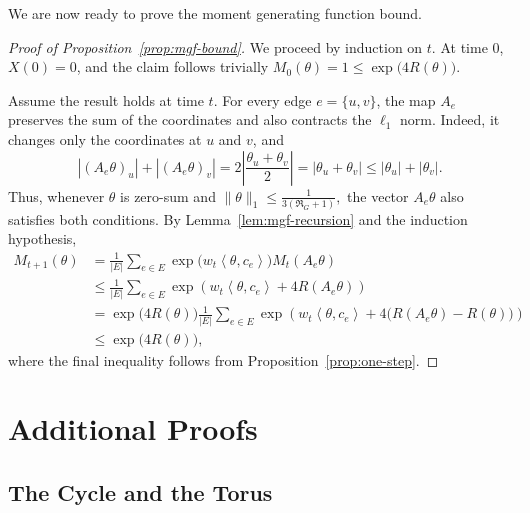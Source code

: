 \documentclass[11pt]{article}
\numberwithin{equation}{section}
\newcommand{\1}{\mathbf{1}}
\newcommand{\ip}[2]{\left\langle #1,#2\right\rangle}
\begin{document}
\medskip

We are now ready to prove the moment generating function bound.

\medskip

\begin{proof}[Proof of Proposition~\ref{prop:mgf-bound}]
We proceed by induction on \(t\). At time \(0\), \(X(0)=0\), and the claim follows trivially
\(
M_0(\theta)=1\le\exp\bigl(4R(\theta)\bigr).
\)

\medskip

Assume the result holds at time \(t\). For every edge \(e=\{u,v\}\), the map \(A_e\) preserves the sum of the coordinates and also contracts the \(\ell_1\) norm. Indeed, it changes only the coordinates at \(u\) and \(v\), and
\[
|(A_e\theta)_u|+|(A_e\theta)_v|
=
2\left|
\frac{\theta_u+\theta_v}{2}
\right|
=
|\theta_u+\theta_v|
\le
|\theta_u|+|\theta_v|.
\]
Thus, whenever \(\theta\) is zero-sum and \( \|\theta\|_1 \le \frac{1}{3(\Re_G+1)}, \) the vector \(A_e\theta\) also satisfies both conditions. By Lemma~\ref{lem:mgf-recursion} and the induction hypothesis,
\[
\begin{aligned}
M_{t+1}(\theta)
&=
\frac1{|E|}
\sum_{e\in E}
\exp\bigl(w_t\ip{\theta}{c_e}\bigr)
M_t(A_e\theta)\\
&\le
\frac1{|E|}
\sum_{e\in E}
\exp\left(
 w_t\ip{\theta}{c_e}
+
4R(A_e\theta)
\right)\\
&=
\exp\bigl(4R(\theta)\bigr)
\frac1{|E|}
\sum_{e\in E}
\exp\left(
 w_t\ip{\theta}{c_e}
+
4\bigl(R(A_e\theta)-R(\theta)\bigr)
\right)\\
&\le
\exp\bigl(4R(\theta)\bigr),
\end{aligned}
\]
where the final inequality follows from Proposition~\ref{prop:one-step}.
\end{proof}

\section{Additional Proofs}
\label{sec:applications}

\subsection{The Cycle and the Torus}\label{sec:cycleandTorus}
\end{document}

